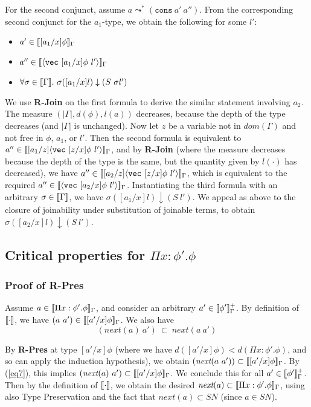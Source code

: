 \documentclass[copyright]{eptcs}
\newcommand{\next}[0]{\textit{next}}
\newcommand{\SN}[0]{\textit{SN}}
\newcommand{\vc}[0]{\texttt{vec}}
\newcommand{\cons}[0]{\texttt{cons}}
\newcommand{\interp}[1]{[\negthinspace[#1]\negthinspace]}
\begin{document}
For the second conjunct, assume $a\leadsto^*(\cons\ a'\ a'')$.  From
the corresponding second conjunct for the $a_1$-type, we obtain the
following for some $l'$:
\begin{itemize}
\item $a'\in\interp{[a_1/x]\phi}_\Gamma$
\item $a''\in\interp{\langle\vc\ [a_1/x]\phi\ l'\rangle}_\Gamma$
\item $\forall \sigma\in\interp{\Gamma}.\ \sigma ([a_1/x]l) \downarrow (S\ \sigma l')$ 
\end{itemize}
\noindent We use \textbf{R-Join} on the first formula to derive the
similar statement involving $a_2$. The measure
$(|\Gamma|,d(\phi),l(a))$ decreases, because the depth of the type
decreases (and $|\Gamma|$ is unchanged).  Now let $z$ be a variable
not in $\textit{dom}(\Gamma)$ and not free in $\phi$, $a_1$, or $l'$.
Then the second formula is equivalent to
$a''\in\interp{[a_1/z]\langle\vc\ [z/x]\phi\ l'\rangle}_\Gamma$, and
by \textbf{R-Join} (where the measure decreases because the depth of
the type is the same, but the quantity given by $l(\cdot)$ has
decreased), we have
$a''\in\interp{[a_2/z]\langle\vc\ [z/x]\phi\ l'\rangle}_\Gamma$, which
is equivalent to the required
$a''\in\interp{\langle\vc\ [a_2/x]\phi\ l'\rangle}_\Gamma$.
Instantiating the third formula with an arbitrary
$\sigma\in\interp{\Gamma}$, we have $\sigma ([a_1/x]l) \downarrow
(S\ l')$.  We appeal as above to the closure of joinability under
substitution of joinable terms, to obtain $\sigma ([a_2/x]l)
\downarrow (S\ l')$.

\subsection{Critical properties for $\Pi x:\phi'.\phi$}

\subsubsection{Proof of \textbf{R-Pres}}

Assume $a\in\interp{\Pi x:\phi'.\phi}_\Gamma$, and consider an
arbitrary $a'\in\interp{\phi'}^+_\Gamma$.  By definition of
$\interp{\cdot}$, we have $(a\ a')\in\interp{[a'/x]\phi}_\Gamma$.  We
also have
\begin{equation}
(\next(a)\ a') \ \subset\ \next(a\ a') \label{eq7}
\end{equation}

\noindent By \textbf{R-Pres} at type $[a'/x]\phi$ (where we have
$d([a'/x]\phi) < d(\Pi x:\phi'.\phi)$, and so can apply the induction
hypothesis), we obtain
$(\next(a\ a'))\subset\interp{[a'/x]\phi}_\Gamma$.  By (\ref{eq7}),
this implies $(\next(a)\ a')\subset\interp{[a'/x]\phi}_\Gamma$.  We
conclude this for all $a'\in\interp{\phi'}^+_\Gamma$.  Then by the
definition of $\interp{\cdot}$, we obtain the desired
$\next(a)\subset\interp{\Pi x:\phi'.\phi}_\Gamma$, using also Type
Preservation and the fact that $\next(a)\subset\SN$ (since $a\in\SN$).
\end{document}
